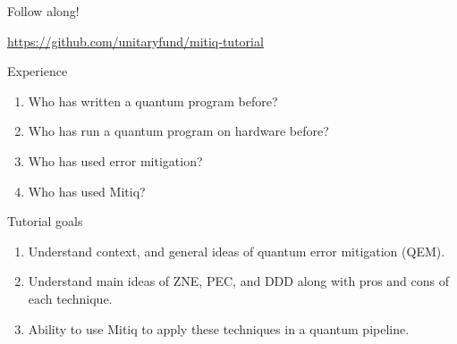 \documentclass[11pt,aspectratio=1610,xcolor=dvipsnames]{beamer}
\begin{document}
\begin{frame}{Follow along!}
	\begin{center}

		\url{https://github.com/unitaryfund/mitiq-tutorial}
	\end{center}
\end{frame}

\begin{frame}{Experience}
	\begin{enumerate}[<+->]
		\item Who has written a quantum program before?
		\item Who has run a quantum program on hardware before?
		\item Who has used error mitigation?
		\item Who has used Mitiq?
	\end{enumerate}
\end{frame}

\begin{frame}{Tutorial goals}
	\begin{enumerate}
		\item Understand context, and general ideas of quantum error mitigation (QEM).
		\item Understand main ideas of ZNE, PEC, and DDD along with pros and cons of each technique.
		\item Ability to use Mitiq to apply these techniques in a quantum pipeline.
	\end{enumerate}
\end{frame}
\end{document}
